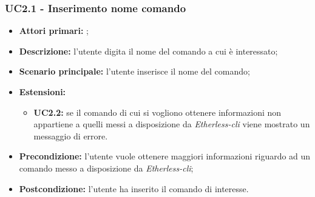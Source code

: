 \subsubsection{UC2.1 - Inserimento nome comando}
\begin{itemize}
	\item \textbf{Attori primari:} \ug{};
	\item \textbf{Descrizione:}  l’utente digita il nome del comando a cui è interessato;
	\item \textbf{Scenario principale:} l’utente inserisce il nome del comando; 
	\item \textbf{Estensioni:} 
	\begin{itemize}
		\item \textbf{UC2.2:} se il comando di cui si vogliono ottenere informazioni non appartiene a quelli messi a disposizione da \textit{Etherless-cli} viene mostrato un messaggio di errore. 
	\end{itemize}
	\item \textbf{Precondizione:} l’utente vuole ottenere maggiori informazioni riguardo ad un comando messo a disposizione da \textit{Etherless-cli}; 
	\item \textbf{Postcondizione:} l’utente ha inserito il comando di interesse.
\end{itemize}